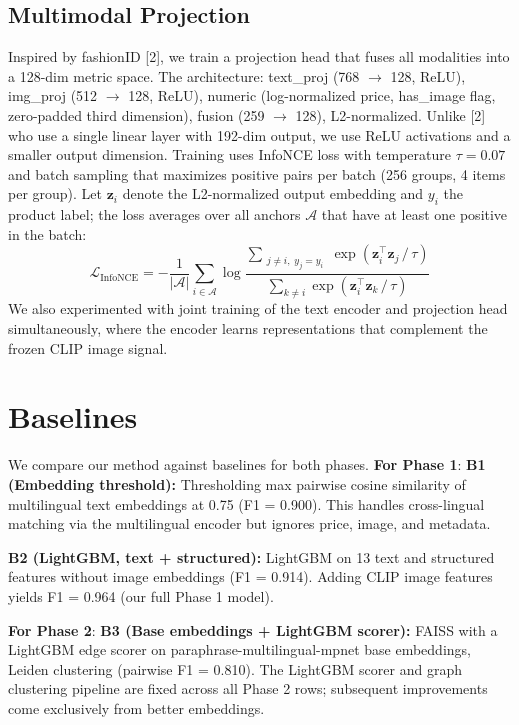 \documentclass[10pt,twocolumn,a4paper]{article}
\begin{document}
\subsection{Multimodal Projection}
Inspired by fashionID [2], we train a projection head that fuses all modalities into a 128-dim metric space. The architecture: text\_proj (768 $\rightarrow$ 128, ReLU), img\_proj (512 $\rightarrow$ 128, ReLU), numeric (log-normalized price, has\_image flag, zero-padded third dimension), fusion (259 $\rightarrow$ 128), L2-normalized. Unlike [2] who use a single linear layer with 192-dim output, we use ReLU activations and a smaller output dimension. Training uses InfoNCE loss with temperature $\tau = 0.07$ and batch sampling that maximizes positive pairs per batch (256 groups, 4 items per group). Let $\mathbf{z}_i$ denote the L2-normalized output embedding and $y_i$ the product label; the loss averages over all anchors $\mathcal{A}$ that have at least one positive in the batch:
\begin{equation}
\mathcal{L}_{\text{InfoNCE}} = -\frac{1}{|\mathcal{A}|}\sum_{i \in \mathcal{A}} \log \frac{\displaystyle\sum_{\substack{j \neq i,\; y_j = y_i}} \exp\!\left(\mathbf{z}_i^\top \mathbf{z}_j\, /\, \tau\right)}{\displaystyle\sum_{k \neq i} \exp\!\left(\mathbf{z}_i^\top \mathbf{z}_k\, /\, \tau\right)}
\end{equation} We also experimented with joint training of the text encoder and projection head simultaneously, where the encoder learns representations that complement the frozen CLIP image signal.

\section{Baselines}
We compare our method against baselines for both phases. \textbf{For Phase 1}:
\textbf{B1 (Embedding threshold):} Thresholding max pairwise cosine similarity of multilingual text 
embeddings at 0.75 (F1 = 0.900). This handles cross-lingual matching via the multilingual encoder but 
ignores price, image, and metadata.

\textbf{B2 (LightGBM, text + structured):} LightGBM on 13 text and structured features without 
image embeddings (F1 = 0.914). Adding CLIP image features yields F1 = 0.964 (our full Phase 1 model).

\textbf{For Phase 2}:
\textbf{B3 (Base embeddings + LightGBM scorer):} FAISS with a LightGBM edge scorer on
paraphrase-multilingual-mpnet base embeddings, Leiden clustering (pairwise F1 = 0.810).
The LightGBM scorer and graph clustering pipeline are fixed across all Phase 2 rows;
subsequent improvements come exclusively from better embeddings.
\end{document}
